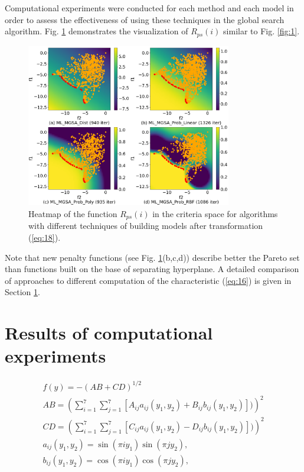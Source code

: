 \documentclass[runningheads]{llncs}
\begin{document}
Computational experiments were conducted for each method and each model in order to assess the effectiveness of using these techniques in the global search algorithm. Fig. \ref{fig:2} demonstrates the visualization of $R_{ps}(i)$ similar to Fig. \ref{fig:1}.
\begin{figure}
\centering
\includegraphics[width=0.8\textwidth]{fig2.png}
\caption{Heatmap of the function $R_{ps}(i)$ in the criteria space for algorithms with different techniques of building models after transformation (\ref{eq:18}).} 
\label{fig:2}
\end{figure}

Note that new penalty functions (see Fig. \ref{fig:2}(b,c,d)) describe better the Pareto set than functions built on the base of separating hyperplane. A detailed comparison of approaches to different computation of the characteristic (\ref{eq:16}) is given in Section \ref{sec:5}. 

\section{Results of computational experiments}
\label{sec:5}


\begin{equation}
    \label{eq:19}
		\begin{matrix}
		  f(y)= -(AB + CD)^{1/2} \\
			AB =(\sum_{i=1}^7{\sum_{j=1}^7{[A_{ij} a_{ij} (y_1,y_2) + B_{ij} b_{ij} (y_1,y_2)])}})^2 \\
			CD =(\sum_{i=1}^7{\sum_{j=1}^7{[C_{ij} a_{ij} (y_1,y_2) - D_{ij} b_{ij} (y_1,y_2)])}})^2 \\
			a_{ij} (y_1,y_2) = \sin(\pi i y_1) \sin(\pi j y_2), \\
			b_{ij} (y_1,y_2) = \cos(\pi i y_1) \cos(\pi j y_2),
		\end{matrix}
\end{equation}
\end{document}
